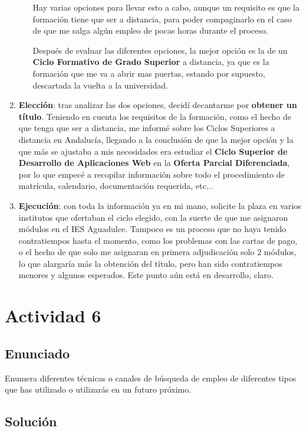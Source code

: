 \begin{enumerate}
\begin{itemize}
       Hay varias opciones para llevar esto a cabo, aunque un requisito es que la formación tiene que ser a distancia, para poder compaginarlo en el caso de que me salga algún empleo de pocas horas durante el proceso.

       Después de evaluar las diferentes opciones, la mejor opción es la de un \textbf{Ciclo Formativo de Grado Superior} a distancia, ya que es la formación que me va a abrir mas puertas, estando por supuesto, descartada la vuelta a la universidad.
     \end{itemize}

     \item \textbf{Elección}: tras analizar las dos opciones, decidí decantarme por \textbf{obtener un título}. Teniendo en cuenta los requisitos de la formación, como el hecho de que tenga que ser a distancia, me informé sobre los Ciclos Superiores a distancia en Andalucía, llegando a la conclusión de que la mejor opción y la que más se ajustaba a mis necesidades era estudiar el \textbf{Ciclo Superior de Desarrollo de Aplicaciones Web} en la \textbf{Oferta Parcial Diferenciada}, por lo que empecé a recopilar información sobre todo el procedimiento de matrícula, calendario, documentación requerida, etc...

     \item \textbf{Ejecución}: con toda la información ya en mi mano, solicite la plaza en varios institutos que ofertaban el ciclo elegido, con la suerte de que me asignaron módulos en el IES Aguadulce. Tampoco es un proceso que no haya tenido contratiempos hasta el momento, como los problemas con las cartas de pago, o el hecho de que solo me asignaran en primera adjudicación solo 2 módulos, lo que alargaría más la obtención del título, pero han sido contratiempos menores y algunos esperados. Este punto aún está en desarrollo, claro.
\end{enumerate}

\section{Actividad 6}
\subsection{Enunciado}
Enumera diferentes técnicas o canales de búsqueda de empleo de diferentes tipos que has utilizado o utilizarás en un futuro próximo.

\subsection{Solución}












\newpage



